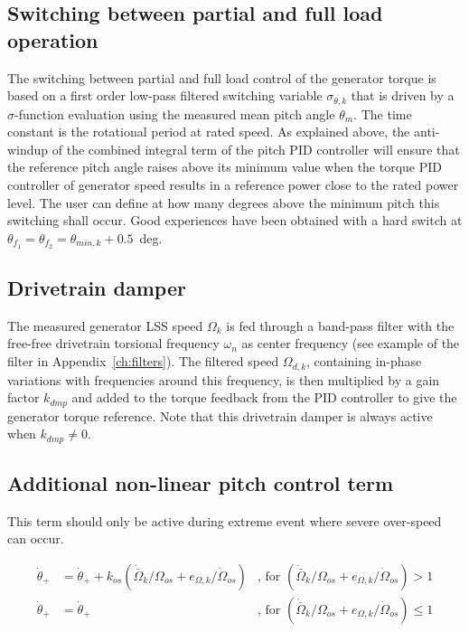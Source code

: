 \subsection{Switching between partial and full load operation}

The switching between partial and full load control of the generator torque is based on a first order low-pass filtered switching variable $\sigma_{\theta,k}$ that is driven by a $\sigma$-function evaluation using the measured mean pitch angle $\theta_m$. The time constant is the rotational period at rated speed. As explained above, the anti-windup of the combined integral term of the pitch PID controller will ensure that the reference pitch angle raises above its minimum value when the torque PID controller of generator speed results in a reference power close to the rated power level. The user can define at how many degrees above the minimum pitch this switching shall occur. Good experiences have been obtained with a hard switch at $\theta_{f_1}=\theta_{f_2}=\theta_{min,k}+0.5$~deg.

\subsection{Drivetrain damper}\label{s:dmp}

The measured generator LSS speed $\Omega_k$ is fed through a band-pass filter with the free-free drivetrain torsional frequency $\omega_n$ as center frequency (see example of the filter in Appendix~\ref{ch:filters}). The filtered speed $\Omega_{d,k}$, containing in-phase variations with frequencies around this frequency, is then multiplied by a gain factor $k_{dmp}$ and added to the torque feedback from the PID controller to give the generator torque reference. Note that this drivetrain damper is always active when $k_{dmp} \neq 0$.

\subsection{Additional non-linear pitch control term}

This term should only be active during extreme event where severe over-speed can occur.

\begin{align}
	\dot{\theta}_{+} &= \dot{\theta}_{+} + k_{os} ( \dot{\bar{\Omega}}_k/\Omega_{os} + e_{\Omega,k}/\dot{\Omega}_{os} ) &\text{, for } ( \dot{\bar{\Omega}}_k/\Omega_{os} + e_{\Omega,k}/\dot{\Omega}_{os} ) > 1 \\
	\dot{\theta}_{+} &= \dot{\theta}_{+} &\text{, for } ( \dot{\bar{\Omega}}_k/\Omega_{os} + e_{\Omega,k}/\dot{\Omega}_{os} ) \leq 1	
\end{align}

